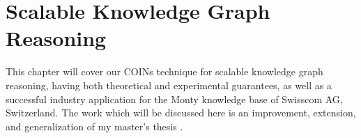\chapter{Scalable Knowledge Graph Reasoning}
\label{chp: kg_reasoning}


This chapter will cover our COINs technique for scalable knowledge graph reasoning, having both theoretical and experimental guarantees, as well as a successful industry application for the Monty knowledge base of Swisscom AG, Switzerland. The work which will be discussed here is an improvement, extension, and generalization of my master's thesis \cite{janchevski_graph_2021}.



